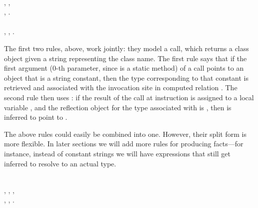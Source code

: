 \begin{rules}
  \\
\tab    {}, , \\
\tab    {}, .\\
  \\
\tab {}, , .\\
\end{rules}

\noindent The first two rules, above, work jointly: they model a
 call, which returns a class object given a string
representing the class name. The first rule says that if the first
argument (0-th parameter, since  is a static method) of
a  call points to an object that is a string constant,
then the type corresponding to that constant is retrieved and
associated with the invocation site in computed relation
.  The second rule then uses
: if the result of the  call at
instruction  is assigned to a local variable , and the
reflection object for the type associated with  is ,
then  is inferred to point to .

The above rules could easily be combined into one. However, their
split form is more flexible. In later sections we will add more
rules for producing  facts---for
instance, instead of constant strings we will have expressions that
still get inferred to resolve to an actual type.



\begin{rules}
  \\
\tab {}, , 
     ,\\
\tab {}, , 
     .\\
\end{rules}

